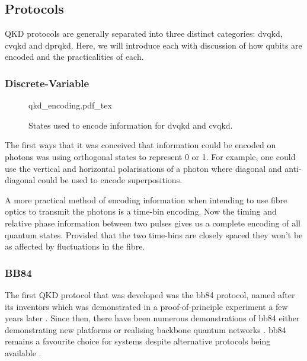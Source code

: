 
\subsection{Protocols}

\Ac{QKD} protocols are generally separated into three distinct categories: \acf{dvqkd}, \acf{cvqkd} and \acf{dprqkd}. Here, we will introduce each with discussion of how qubits are encoded and the practicalities of each.

\subsubsection{Discrete-Variable}

\begin{figure}
	\centering
	\def\svgwidth{0.9\textwidth}
   	{qkd_encoding.pdf_tex}
   	\caption[\acs{dvqkd} and \acs{cvqkd} encoding]{States used to encode information for \acs{dvqkd} and \acs{cvqkd}.}
\end{figure}

The first ways that it was conceived that information could be encoded on photons was using orthogonal states to represent 0 or 1. For example, one could use the vertical and horizontal polarisations of a photon where diagonal and anti-diagonal could be used to encode superpositions. 

A more practical method of encoding information when intending to use fibre optics to transmit the photons is a time-bin encoding. Now the timing and relative phase information between two pulses gives us a complete encoding of all quantum states. Provided that the two time-bins are closely spaced they won't be as affected by fluctuations in the fibre.

\subsubsection*{BB84}

The first \ac{QKD} protocol that was developed was the \ac{bb84} protocol, named after its inventors \cite{BB84} which was demonstrated in a proof-of-principle experiment a few years later \cite{bennett1992experimental}. Since then, there have been numerous demonstrations of \ac{bb84} either demonstrating new platforms or realising backbone quantum networks \cite{pirandola2019advances}. \Ac{bb84} remains a favourite choice for systems despite alternative protocols being available \cite{sarg2004, DPS-QKD, COW-QKD, B92}.

